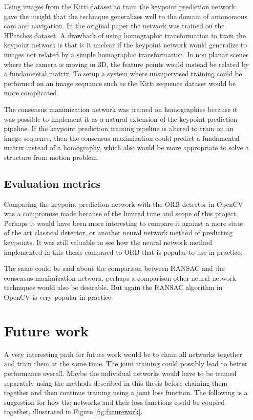 Using images from the Kitti dataset to train the keypoint prediction network gave the insight that the technique generalizes well to the domain of autonomous cars and navigation. In the original paper the network was trained on the HPatches\cite{hpatches} dataset. A drawback of using homographic transformation to train the keypoint network is that is it unclear if the keypoint network would generalize to images not related by a simple homographic transformation. In non planar scenes where the camera is moving in 3D, the feature points would instead be related by a fundamental matrix. To setup a system where unsupervised training could be performed on an image sequance such as the Kitti sequence dataset would be more complicated\cite{pose-sup}.

The consensus maximization network was trained on homographies because it was possible to implement it as a natural extension of the keypoint prediction pipeline. If the keypoint prediction training pipeline is altered to train on an image sequence, then the consensus maximization could predict a fundamental matrix instead of a homography, which also would be more appropriate to solve a structure from motion problem.

\subsection{Evaluation metrics}

Comparing the keypoint prediction network with the ORB detector in OpenCV was a compromise made because of the limited time and scope of this project. Perhaps it would have been more interesting to compare it against a more state of the art classical detector, or another neural network method of predicting keypoints. It was still valuable to see how the neural network method implemented in this thesis compared to ORB that is popular to use in practice.

The same could be said about the comparison between RANSAC and the consensus maximization network, perhaps a comparison other neural network techniques would also be desirable. But again the RANSAC algorithm in OpenCV is very popular in practice.

\section{Future work}

A very interesting path for future work would be to chain all networks together and train them at the same time. The joint training could possibly lead to better performance overall. Maybe the individual networks would have to be trained separately using the methods described in this thesis before chaining them together and then continue training using a joint loss function. The following is a suggestion for how the networks and their loss functions could be coupled together, illustrated in Figure \ref{fig:futurework}.

